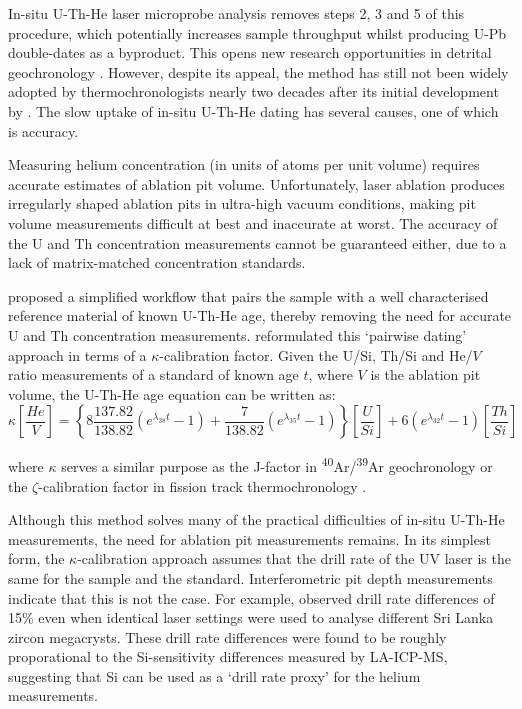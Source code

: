 \documentclass{article}
\begin{document}
In-situ U-Th-He laser microprobe analysis removes steps 2, 3 and 5 of
this procedure, which potentially increases sample throughput whilst
producing U-Pb double-dates as a byproduct. This opens new research
opportunities in detrital geochronology \citep{boyce2006, boyce2009,
  vermeesch2012a, tripathy2013, evans2015, danisik2017}. However,
despite its appeal, the method has still not been widely adopted by
thermochronologists nearly two decades after its initial development
by \citet{boyce2006}. The slow uptake of in-situ U-Th-He dating has
several causes, one of which is accuracy.\medskip

Measuring helium concentration (in units of atoms per unit volume)
requires accurate estimates of ablation pit volume.  Unfortunately,
laser ablation produces irregularly shaped ablation pits in ultra-high
vacuum conditions, making pit volume measurements difficult at best
and inaccurate at worst. The accuracy of the U and Th concentration
measurements cannot be guaranteed either, due to a lack of
matrix-matched concentration standards.\medskip

\citet{vermeesch2012a} proposed a simplified workflow that pairs the
sample with a well characterised reference material of known U-Th-He
age, thereby removing the need for accurate U and Th concentration
measurements. \citet{evans2015} reformulated this `pairwise dating'
approach in terms of a $\kappa$-calibration factor. Given the U/Si,
Th/Si and He/$V$ ratio measurements of a standard of known age $t$,
where $V$ is the ablation pit volume, the U-Th-He age equation can be
written as:
\begin{equation}
  \kappa \left[\frac{He}{V}\right] =
  \left\{
  8 \frac{137.82}{138.82} \left(e^{\lambda_{38}t}-1\right)  +
  \frac{7}{138.82} \left(e^{\lambda_{35}t}-1\right) 
  \right\} \left[\frac{U}{Si}\right] +
  6 \left(e^{\lambda_{32}t}-1\right) \left[\frac{Th}{Si}\right]
  \label{eq:kappa}
\end{equation}

\noindent where $\kappa$ serves a similar purpose as the J-factor in
\textsuperscript{40}Ar/\textsuperscript{39}Ar geochronology
\citep{merrihue1966} or the $\zeta$-calibration factor in fission
track thermochronology \citep{hurford1983}.\medskip

Although this method solves many of the practical difficulties of
in-situ U-Th-He measurements, the need for ablation pit measurements
remains. In its simplest form, the $\kappa$-calibration approach
assumes that the drill rate of the UV laser is the same for the sample
and the standard.  Interferometric pit depth measurements indicate
that this is not the case. For example, \citet{vermeesch2012a}
observed drill rate differences of 15\% even when identical laser
settings were used to analyse different Sri Lanka zircon megacrysts.
These drill rate differences were found to be roughly proporational to
the Si-sensitivity differences measured by LA-ICP-MS, suggesting that
Si can be used as a `drill rate proxy' for the helium
measurements.\medskip
\end{document}
